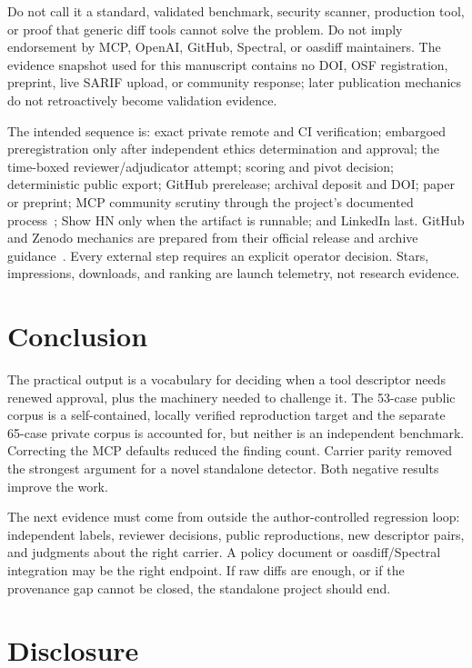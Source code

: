 \documentclass[11pt,letterpaper]{article}
\newcommand{\sarif}{SARIF}
\begin{document}
Do not call it a standard, validated benchmark, security scanner, production tool, or proof that generic diff tools cannot solve the problem. Do not imply endorsement by MCP, OpenAI, GitHub, Spectral, or oasdiff maintainers. The evidence snapshot used for this manuscript contains no DOI, OSF registration, preprint, live \sarif{} upload, or community response; later publication mechanics do not retroactively become validation evidence.

The intended sequence is: exact private remote and CI verification; embargoed preregistration only after independent ethics determination and approval; the time-boxed reviewer/adjudicator attempt; scoring and pivot decision; deterministic public export; GitHub prerelease; archival deposit and DOI; paper or preprint; MCP community scrutiny through the project's documented process~\cite{mcp-sep-guidelines}; Show HN only when the artifact is runnable; and LinkedIn last. GitHub and Zenodo mechanics are prepared from their official release and archive guidance~\cite{github-releases,zenodo-github}. Every external step requires an explicit operator decision. Stars, impressions, downloads, and ranking are launch telemetry, not research evidence.

\section{Conclusion}

The practical output is a vocabulary for deciding when a tool descriptor needs renewed approval, plus the machinery needed to challenge it. The 53-case public corpus is a self-contained, locally verified reproduction target and the separate 65-case private corpus is accounted for, but neither is an independent benchmark. Correcting the MCP defaults reduced the finding count. Carrier parity removed the strongest argument for a novel standalone detector. Both negative results improve the work.

The next evidence must come from outside the author-controlled regression loop: independent labels, reviewer decisions, public reproductions, new descriptor pairs, and judgments about the right carrier. A policy document or oasdiff/Spectral integration may be the right endpoint. If raw diffs are enough, or if the provenance gap cannot be closed, the standalone project should end.

\section*{Disclosure}
\end{document}
